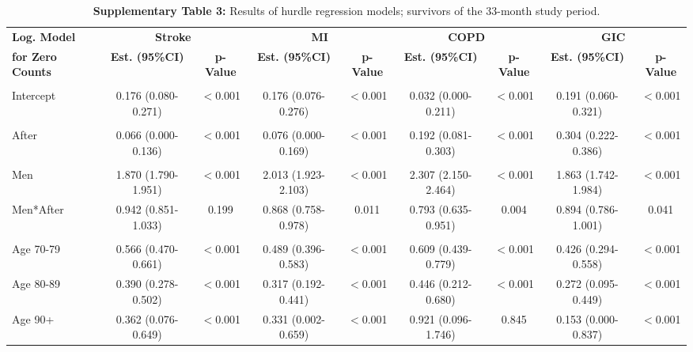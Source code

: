 \begin{landscape}


\begin{table}[htbp]
  \scriptsize
  \centering
  \caption*{\textbf{Supplementary Table 3:} Results of hurdle regression models; 
  								survivors of the 33-month study period.}
    \begin{tabular}{lcccccccc}
    \toprule
    \textbf{Log. Model } & \multicolumn{2}{c}{\textbf{Stroke}} & \multicolumn{2}{c}{\textbf{MI}} & \multicolumn{2}{c}{\textbf{COPD}} & \multicolumn{2}{c}{\textbf{GIC}} \\
    \textbf{for Zero Counts} & \textbf{Est. (95\%CI)} & \textbf{p-Value} & \textbf{Est. (95\%CI)} & \textbf{p-Value} & \textbf{Est. (95\%CI)} & \textbf{p-Value} & \textbf{Est. (95\%CI)} & \textbf{p-Value} \\
    \midrule
          &       &       &       &       &       &       &       &  \\
    Intercept & 0.176 (0.080-0.271) & $<$0.001 & 0.176 (0.076-0.276) & $<$0.001 & 0.032 (0.000-0.211) & $<$0.001 & 0.191 (0.060-0.321) & $<$0.001 \\
          &       &       &       &       &       &       &       &  \\
    After  & 0.066 (0.000-0.136) & $<$0.001 & 0.076 (0.000-0.169) & $<$0.001 & 0.192 (0.081-0.303) & $<$0.001 & 0.304 (0.222-0.386) & $<$0.001 \\
          &       &       &       &       &       &       &       &  \\
    Men   & 1.870 (1.790-1.951) & $<$0.001 & 2.013 (1.923-2.103) & $<$0.001 & 2.307 (2.150-2.464) & $<$0.001 & 1.863 (1.742-1.984) & $<$0.001 \\
    Men*After  & 0.942 (0.851-1.033) & 0.199 & 0.868 (0.758-0.978) & 0.011 & 0.793 (0.635-0.951) & 0.004 & 0.894 (0.786-1.001) & 0.041 \\
          &       &       &       &       &       &       &       &  \\
    Age 70-79 & 0.566 (0.470-0.661) & $<$0.001 & 0.489 (0.396-0.583) & $<$0.001 & 0.609 (0.439-0.779) & $<$0.001 & 0.426 (0.294-0.558) & $<$0.001 \\
    Age 80-89 & 0.390 (0.278-0.502) & $<$0.001 & 0.317 (0.192-0.441) & $<$0.001 & 0.446 (0.212-0.680) & $<$0.001 & 0.272 (0.095-0.449) & $<$0.001 \\
    Age 90+ & 0.362 (0.076-0.649) & $<$0.001 & 0.331 (0.002-0.659) & $<$0.001 & 0.921 (0.096-1.746) & 0.845 & 0.153 (0.000-0.837) & $<$0.001 \\

\end{tabular}
\end{table}
\end{landscape}
